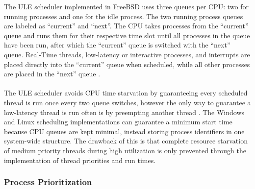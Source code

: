 \documentclass[10pt,draftclsnofoot,onecolumn]{article}
\begin{document}
\noindent The ULE scheduler implemented in FreeBSD uses three queues per CPU: two for running processes and one for the idle process. The two running process queues are labeled as “current” and “next”. The CPU takes processes from the “current” queue and runs them for their respective time slot until all processes in the queue have been run, after which the “current” queue is switched with the “next” queue. Real-Time threads, low-latency or interactive processes, and interrupts are placed directly into the “current” queue when scheduled, while all other processes are placed in the “next” queue \cite{Roberson03ule:a}. 
\\\\
The ULE scheduler avoids CPU time starvation by guaranteeing every scheduled thread is run once every two queue switches, however the only way to guarantee a low-latency thread is run often is by preempting another thread \cite{Roberson03ule:a}. The Windows and Linux scheduling implementations can guarantee a minimum start time because CPU queues are kept minimal, instead storing process identifiers in one system-wide structure. The drawback of this is that complete resource starvation of medium priority threads during high utilization is only prevented through the implementation of thread priorities and run times.

\subsubsection{Process Prioritization}
\end{document}
